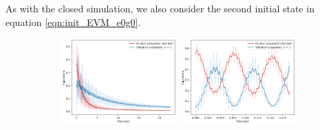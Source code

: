 \documentclass[11pt]{article}
\begin{document}
As with the closed simulation, we also consider the second initial state in equation \eqref{eqn:init_EVM_e0g0}.
\begin{figure}[H]
    \centering

    \begin{subfigure}{\textwidth}
        \centering
        \includegraphics[width=0.49\textwidth]{Research Project/Code/results/ExVib/Open/Population/Envelope/pops_ex_spont_eg.png}
        \hfill
        \includegraphics[width=0.49\textwidth]{Research Project/Code/results/ExVib/Open/Population/Fast/pops_ex_spont_eg.png}
        \caption{}
        \label{fig:EVM_OQS_Pop_spont_eg}
    \end{subfigure}

    \vspace{0.8em}


\end{figure}
\end{document}
